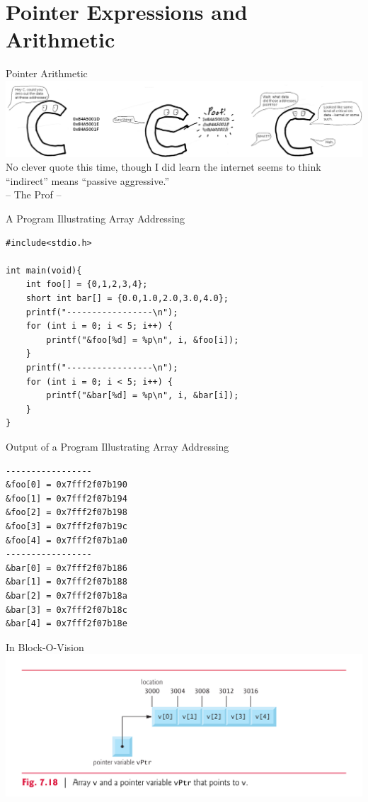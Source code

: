\documentclass[11pt]{beamer}
\begin{document}
\section[Arith]{Pointer Expressions and Arithmetic}
\begin{frame}{Pointer Arithmetic}
\center
\includegraphics[scale=0.225]{c_os-files.png}
\\
\vspace{2em}
No clever quote this time, though I did learn the internet seems to think ``indirect'' means ``passive aggressive.''\\
-- The Prof -- \\
\end{frame}

\begin{frame}[fragile=singleslide]{A Program Illustrating Array Addressing}
\begin{lstlisting}[style=C]
#include<stdio.h>

int main(void){
	int foo[] = {0,1,2,3,4};
	short int bar[] = {0.0,1.0,2.0,3.0,4.0};
	printf("-----------------\n");
	for (int i = 0; i < 5; i++) {
		printf("&foo[%d] = %p\n", i, &foo[i]);
	}
	printf("-----------------\n");
	for (int i = 0; i < 5; i++) {
		printf("&bar[%d] = %p\n", i, &bar[i]);
	}
}
\end{lstlisting}
\end{frame}

\begin{frame}[fragile=singleslide]{Output of a Program Illustrating Array Addressing}
\begin{verbatim}
-----------------
&foo[0] = 0x7fff2f07b190
&foo[1] = 0x7fff2f07b194
&foo[2] = 0x7fff2f07b198
&foo[3] = 0x7fff2f07b19c
&foo[4] = 0x7fff2f07b1a0
-----------------
&bar[0] = 0x7fff2f07b186
&bar[1] = 0x7fff2f07b188
&bar[2] = 0x7fff2f07b18a
&bar[3] = 0x7fff2f07b18c
&bar[4] = 0x7fff2f07b18e
\end{verbatim}
\end{frame}

\begin{frame}{In Block-O-Vision}
\center
\includegraphics[scale=0.1]{tbe.png}
\end{frame}
\end{document}
